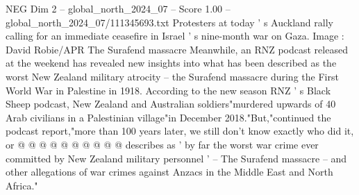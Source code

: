 \begin{textsample}{NEG Dim 2 – global\_north\_2024\_07 – Score 1.00 – global\_north\_2024\_07/111345693.txt}
Protesters at today ' s Auckland rally calling for an immediate ceasefire in Israel ' s nine-month war on Gaza.
Image : David Robie/APR The Surafend massacre Meanwhile, an RNZ podcast released at the weekend has revealed new insights into what has been described as the worst New Zealand military atrocity -- the Surafend massacre during the First World War in Palestine in 1918.
According to the new season RNZ ' s Black Sheep podcast, New Zealand and Australian soldiers"murdered upwards of 40 Arab civilians in a Palestinian village"in December 2018."But,"continued the podcast report,"more than 100 years later, we still don't know exactly who did it, or @ @ @ @ @ @ @ @ @ @ describes as ' by far the worst war crime ever committed by New Zealand military personnel ' -- The Surafend massacre -- and other allegations of war crimes against Anzacs in the Middle East and North Africa."

\end{textsample}
